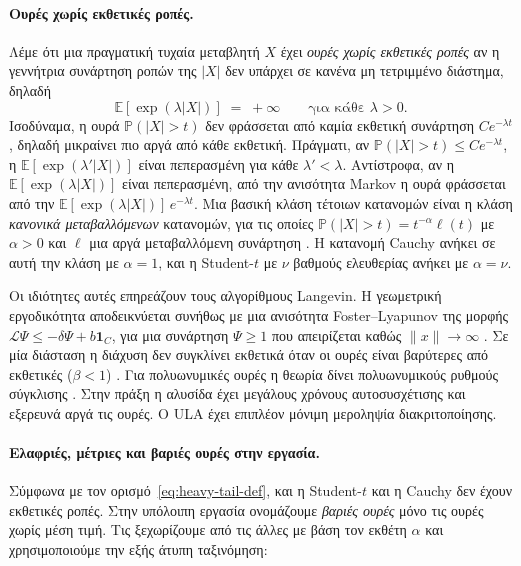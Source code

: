 \paragraph{Ουρές χωρίς εκθετικές ροπές.}
\label{sec:bg-heavytails}
Λέμε ότι μια πραγματική τυχαία μεταβλητή $X$ έχει \emph{ουρές χωρίς εκθετικές ροπές}
αν η γεννήτρια συνάρτηση
ροπών της $|X|$ δεν υπάρχει σε κανένα μη τετριμμένο διάστημα, δηλαδή
\begin{equation}
  \mathbb{E}\!\left[\exp(\lambda |X|)\right] \;=\; +\infty
  \qquad \text{για κάθε } \lambda > 0.
  \label{eq:heavy-tail-def}
\end{equation}
Ισοδύναμα, η ουρά $\mathbb{P}(|X| > t)$ δεν φράσσεται από καμία εκθετική
συνάρτηση $C e^{-\lambda t}$, δηλαδή μικραίνει πιο αργά από κάθε εκθετική. Πράγματι,
αν $\mathbb{P}(|X| > t) \le C e^{-\lambda t}$, η $\mathbb{E}[\exp(\lambda' |X|)]$ είναι
πεπερασμένη για κάθε $\lambda' < \lambda$. Αντίστροφα, αν η
$\mathbb{E}[\exp(\lambda |X|)]$ είναι πεπερασμένη, από την ανισότητα Markov η ουρά
φράσσεται από την $\mathbb{E}[\exp(\lambda |X|)]\, e^{-\lambda t}$. Μια βασική κλάση τέτοιων
κατανομών είναι η κλάση \emph{κανονικά μεταβαλλόμενων} κατανομών, για τις
οποίες $\mathbb{P}(|X| > t) = t^{-\alpha} \ell(t)$ με $\alpha > 0$ και $\ell$ μια
αργά μεταβαλλόμενη συνάρτηση \citep[Ch.~2]{resnick2007heavy}. Η κατανομή Cauchy ανήκει σε αυτή την κλάση με
$\alpha = 1$, και η Student-$t$ με $\nu$ βαθμούς ελευθερίας ανήκει με $\alpha = \nu$.

Οι ιδιότητες αυτές επηρεάζουν τους αλγορίθμους Langevin. Η γεωμετρική
εργοδικότητα αποδεικνύεται συνήθως με μια ανισότητα Foster--Lyapunov της μορφής
$\mathcal{L}\Psi \leq -\delta\Psi + b\mathbf{1}_C$, για μια συνάρτηση $\Psi \ge 1$ που
απειρίζεται καθώς $\|x\| \to \infty$ \citep{meyn2009markov, mattingly2002ergodicity}.
Σε μία διάσταση η διάχυση δεν συγκλίνει εκθετικά όταν οι ουρές είναι βαρύτερες από
εκθετικές ($\beta < 1$) \citep{roberts1996exponential}. Για πολυωνυμικές ουρές η
θεωρία δίνει πολυωνυμικούς ρυθμούς σύγκλισης \citep{jarner2007convergence}. Στην
πράξη η αλυσίδα έχει μεγάλους χρόνους αυτοσυσχέτισης και εξερευνά αργά τις ουρές.
Ο ULA έχει επιπλέον μόνιμη μεροληψία διακριτοποίησης.

\paragraph{Ελαφριές, μέτριες και βαριές ουρές στην εργασία.}
Σύμφωνα με τον ορισμό~\eqref{eq:heavy-tail-def}, και η Student-$t$ και η Cauchy
δεν έχουν εκθετικές ροπές. Στην υπόλοιπη εργασία ονομάζουμε \emph{βαριές ουρές}
μόνο τις ουρές χωρίς μέση τιμή. Τις ξεχωρίζουμε από τις άλλες με βάση τον εκθέτη
$\alpha$ και χρησιμοποιούμε την εξής άτυπη ταξινόμηση:

